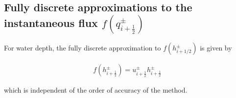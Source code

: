 \documentclass[SingleSpace,12pt,Proceedings]{Serre_ASCE}
\begin{document}
\subsection{Fully discrete approximations to the instantaneous flux $f(q^{\pm}_{i + \frac{1}{2}})$} %
For water depth, the fully discrete approximation to $f(h^\pm_{i + 1/2})$ is given by
\begin{linenomath*}
\begin{gather*} %
f\left(h^\pm_{i + \frac{1}{2}}\right) = u^\pm_{i + \frac{1}{2}} h^\pm_{i + \frac{1}{2}}
\end{gather*}
\end{linenomath*}
which is independent of the order of accuracy of the method. 
\end{document}
